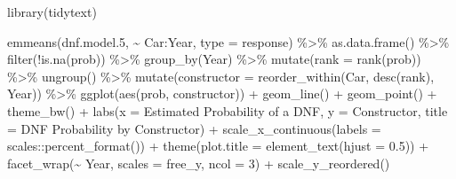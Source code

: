 \documentclass[
]{book}
\newenvironment{Shaded}{\begin{snugshade}}{\end{snugshade}}
\newcommand{\AttributeTok}[1]{\textcolor[rgb]{0.77,0.63,0.00}{#1}}
\newcommand{\DecValTok}[1]{\textcolor[rgb]{0.00,0.00,0.81}{#1}}
\newcommand{\FloatTok}[1]{\textcolor[rgb]{0.00,0.00,0.81}{#1}}
\newcommand{\FunctionTok}[1]{\textcolor[rgb]{0.00,0.00,0.00}{#1}}
\newcommand{\NormalTok}[1]{#1}
\newcommand{\SpecialCharTok}[1]{\textcolor[rgb]{0.00,0.00,0.00}{#1}}
\newcommand{\StringTok}[1]{\textcolor[rgb]{0.31,0.60,0.02}{#1}}
\begin{document}
\begin{Shaded}
\begin{Highlighting}[]
\FunctionTok{library}\NormalTok{(tidytext)}


\FunctionTok{emmeans}\NormalTok{(dnf.model}\FloatTok{.5}\NormalTok{, }\SpecialCharTok{\textasciitilde{}}\NormalTok{ Car}\SpecialCharTok{:}\NormalTok{Year, }\AttributeTok{type =} \StringTok{\textquotesingle{}response\textquotesingle{}}\NormalTok{) }\SpecialCharTok{\%\textgreater{}\%} 
  \FunctionTok{as.data.frame}\NormalTok{() }\SpecialCharTok{\%\textgreater{}\%} 
  \FunctionTok{filter}\NormalTok{(}\SpecialCharTok{!}\FunctionTok{is.na}\NormalTok{(prob)) }\SpecialCharTok{\%\textgreater{}\%} 
  \FunctionTok{group\_by}\NormalTok{(Year) }\SpecialCharTok{\%\textgreater{}\%}
  \FunctionTok{mutate}\NormalTok{(}\AttributeTok{rank =} \FunctionTok{rank}\NormalTok{(prob)) }\SpecialCharTok{\%\textgreater{}\%}
  \FunctionTok{ungroup}\NormalTok{() }\SpecialCharTok{\%\textgreater{}\%} 
  \FunctionTok{mutate}\NormalTok{(}\AttributeTok{constructor =} \FunctionTok{reorder\_within}\NormalTok{(Car, }\FunctionTok{desc}\NormalTok{(rank), Year)) }\SpecialCharTok{\%\textgreater{}\%}
  \FunctionTok{ggplot}\NormalTok{(}\FunctionTok{aes}\NormalTok{(prob, constructor)) }\SpecialCharTok{+}
  \FunctionTok{geom\_line}\NormalTok{() }\SpecialCharTok{+}
  \FunctionTok{geom\_point}\NormalTok{() }\SpecialCharTok{+} 
  \FunctionTok{theme\_bw}\NormalTok{() }\SpecialCharTok{+}
  \FunctionTok{labs}\NormalTok{(}\AttributeTok{x =} \StringTok{\textquotesingle{}Estimated Probability of a DNF\textquotesingle{}}\NormalTok{,}
       \AttributeTok{y =} \StringTok{\textquotesingle{}Constructor\textquotesingle{}}\NormalTok{,}
       \AttributeTok{title =} \StringTok{\textquotesingle{}DNF Probability by Constructor\textquotesingle{}}\NormalTok{) }\SpecialCharTok{+}
\FunctionTok{scale\_x\_continuous}\NormalTok{(}\AttributeTok{labels =}\NormalTok{ scales}\SpecialCharTok{::}\FunctionTok{percent\_format}\NormalTok{()) }\SpecialCharTok{+}
  \FunctionTok{theme}\NormalTok{(}\AttributeTok{plot.title =} \FunctionTok{element\_text}\NormalTok{(}\AttributeTok{hjust =} \FloatTok{0.5}\NormalTok{)) }\SpecialCharTok{+}
  \FunctionTok{facet\_wrap}\NormalTok{(}\SpecialCharTok{\textasciitilde{}}\NormalTok{ Year, }\AttributeTok{scales =} \StringTok{\textquotesingle{}free\_y\textquotesingle{}}\NormalTok{, }\AttributeTok{ncol =} \DecValTok{3}\NormalTok{) }\SpecialCharTok{+}
  \FunctionTok{scale\_y\_reordered}\NormalTok{()}
\end{Highlighting}
\end{Shaded}
\end{document}
